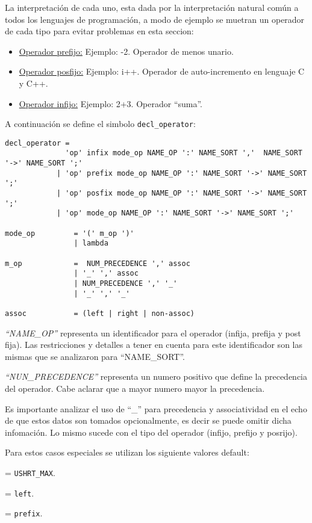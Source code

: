 La interpretación de cada uno, esta dada por la interpretación natural común a todos los lenguajes de programación, a modo de ejemplo se muetran un operador de cada tipo para evitar problemas en esta seccion:
\begin{itemize}
\item \underline{Operador prefijo:} Ejemplo: -2. Operador de menos unario. 
\item \underline{Operador posfijo:} Ejemplo: i++. Operador de auto-incremento en lenguaje C y C++.
\item \underline{Operador infijo:} Ejemplo: 2+3. Operador ``suma''.
\end{itemize}

A continuación se define el simbolo \texttt{decl\_operator}:
\begin{center}
\lstset{language=inform}
\scriptsize
\begin{lstlisting}[frame=single]
decl_operator = 
              'op' infix mode_op NAME_OP ':' NAME_SORT ','  NAME_SORT '->' NAME_SORT ';' 
            | 'op' prefix mode_op NAME_OP ':' NAME_SORT '->' NAME_SORT ';'               
            | 'op' posfix mode_op NAME_OP ':' NAME_SORT '->' NAME_SORT ';'
            | 'op' mode_op NAME_OP ':' NAME_SORT '->' NAME_SORT ';'

mode_op         = '(' m_op ')'
                | lambda

m_op            =  NUM_PRECEDENCE ',' assoc
                | '_' ',' assoc
                | NUM_PRECEDENCE ',' '_'
                | '_' ',' '_'

assoc           = (left | right | non-assoc) 
\end{lstlisting}
\end{center}
\textit{``NAME\_OP''} representa un identificador para el operador (infija, prefija y post fija). Las restricciones y detalles a tener en cuenta para este identificador son las mismas que se analizaron para ``NAME\_SORT''.

\textit{``NUN\_PRECEDENCE''} representa un numero positivo que define la precedencia del operador. Cabe aclarar que a mayor numero mayor la precedencia.

Es importante analizar el uso de ``\_'' para precedencia y associatividad en el echo de que estos datos son tomados opcionalmente, es decir se puede omitir dicha infomación. Lo mismo sucede con el tipo del operador (infijo, prefijo y posrijo). 

Para estos casos especiales se utilizan los siguiente valores default:
\begin{description}
\label{desc:default}
\item [Precedencia] = \texttt{USHRT\_MAX}.
\item [Asociatividad] = \texttt{left}.
\item [Tipo de operador] = \texttt{prefix}.
\end{description}

